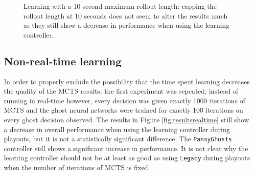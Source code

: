 \begin{figure}
\centering
{}
\caption[Learning with a 10 second maximum rollout length]{Learning with a 10 second maximum rollout length: capping the rollout length at 10 seconds does not seem to alter the results much as they still show a decrease in performance when using the learning controller.}
\label{fig:resultssr}
\end{figure}

\subsection{Non-real-time learning}

In order to properly exclude the possibility that the time spent learning decreases the quality of the MCTS results, the first experiment was repeated; instead of running in real-time however, every decision was given exactly 1000 iterations of MCTS and the ghost neural networks were trained for exactly 100 iterations on every ghost decision observed.  The results in Figure \ref{fig:resultsrealtime} still show a decrease in overall performance when using the learning controller during playouts, but it is not a statistically significant difference.  The {\tt PansyGhosts} controller still shows a significant increase in performance.  It is not clear why the learning controller should not be at least as good as using {\tt Legacy} during playouts when the number of iterations of MCTS is fixed.

